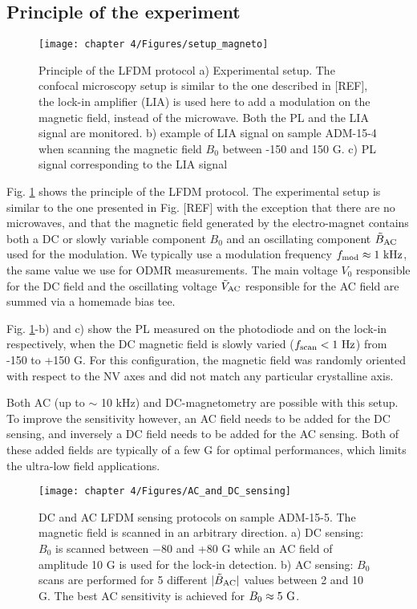 \documentclass[a4paper, 11pt]{book}
\begin{document}
\subsection{Principle of the experiment}

\begin{figure}[h!]
\centering
\texttt{[image: chapter 4/Figures/setup\_magneto]}
\caption{Principle of the LFDM protocol a) Experimental setup. The confocal microscopy setup is similar to the one described in [REF], the lock-in amplifier (LIA) is used here to add a modulation on the magnetic field, instead of the microwave. Both the PL and the LIA signal are monitored. b) example of LIA signal on sample ADM-15-4 when scanning the magnetic field $B_0$ between -150 and 150 G. c) PL signal corresponding to the LIA signal}
\label{setup magneto}
\end{figure}

Fig. \ref{setup magneto} shows the principle of the LFDM protocol. The experimental setup is similar to the one presented in Fig. [REF] with the exception that there are no microwaves, and that the magnetic field generated by the electro-magnet contains both a DC or slowly variable component $B_0$ and an oscillating component $\tilde{B}_{\rm AC}$ used for the modulation. We typically use a modulation frequency $f_{\rm mod} \approx 1\ \rm kHz$, the same value we use for ODMR measurements. The main voltage $V_0$ responsible for the DC field and the oscillating voltage $\tilde{V}_{\rm AC}$ responsible for the AC field are summed via a homemade bias tee.

Fig. \ref{setup magneto}-b) and c) show the PL measured on the photodiode and on the lock-in respectively, when the DC magnetic field is slowly varied ($f_{\rm scan}<1\ \rm Hz$) from -150 to +150 G. For this configuration, the magnetic field was randomly oriented with respect to the NV axes and did not match any particular crystalline axis.

Both AC (up to $\sim$ 10 kHz) and DC-magnetometry are possible with this setup. To improve the sensitivity however, an AC field needs to be added for the DC sensing, and inversely a DC field needs to be added for the AC sensing. Both of these added fields are typically of a few G for optimal performances, which limits the ultra-low field applications.

\begin{figure}[h!]
\centering
\texttt{[image: chapter 4/Figures/AC\_and\_DC\_sensing]}
\caption{DC and AC LFDM sensing protocols on sample ADM-15-5. The magnetic field is scanned in an arbitrary direction. a) DC sensing: $B_0$ is scanned between $-$80 and +80 G while an AC field of amplitude 10 G is used for the lock-in detection. b) AC sensing: $B_0$ scans are performed for 5 different $|\tilde B_{\rm AC}|$ values between 2 and 10 G. The best AC sensitivity is achieved for $B_0\approx 5\ \rm G$.}
\label{AC and DC sensing}
\end{figure}
\end{document}

